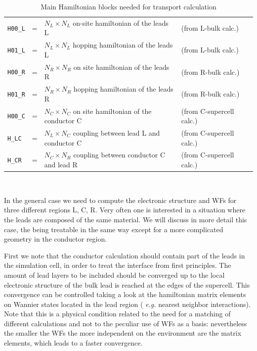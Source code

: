 %
%
\begin{table}[h]
%
\begin{tabular}{lllll}
\texttt{H00\_L} &=& $N_L\times N_L$ on-site hamiltonian
of the leads L & (from L-bulk calc.)\\
\texttt{H01\_L} &=& $N_L\times N_L$ hopping hamiltonian
of the leads L & (from L-bulk calc.) \\
\texttt{H00\_R} &=& $N_R\times N_R$ on site hamiltonian
of the leads R & (from R-bulk calc.) \\
\texttt{H01\_R} &=& $N_R\times N_R$ hopping hamiltonian
of the leads R & (from R-bulk calc.) \\
\texttt{H00\_C} &=& $N_C\times N_C$ on site hamiltonian
of the conductor C & (from C-supercell calc.) \\
\texttt{H\_LC}  &=& $N_L\times N_C$ coupling
between lead L and conductor C & (from C-supercell calc.) \\
\texttt{H\_CR}  &=& $N_C\times N_R$ coupling
between conductor C and lead R & (from C-supercell calc.)
%
%
\end{tabular} \\
%
\caption {Main Hamiltonian blocks needed for transport calculation
          \label{tab:hamiltonian_blocks} }
\end{table}
%
%
%
\noindent In the general case we need to compute the electronic
structure and WFs for three different regions L, C, R. Very often
one is interested in a situation where the leads are composed of
the same material. We will discuss in more detail this case, the
being treatable in the same way except for a more complicated
geometry in the conductor region.

First we note that the conductor calculation should contain part
of the leads in the simulation cell, in order to treat the
interface from first principles. The amount of lead layers to be
included should be converged up to the local electronic structure
of the bulk lead is reached at the edges of the supercell. This
convergence can be controlled taking a look at the hamiltonian
matrix elements on Wannier states located in the lead region ({\it
e.g.} nearest neighbor interactions). Note that this is a physical
condition related to the need for a matching of different
calculations and not to the peculiar use of WFs as a basis:
nevertheless the smaller the WFs the more independent on the
environment are the matrix elements, which leads to a faster
convergence.

